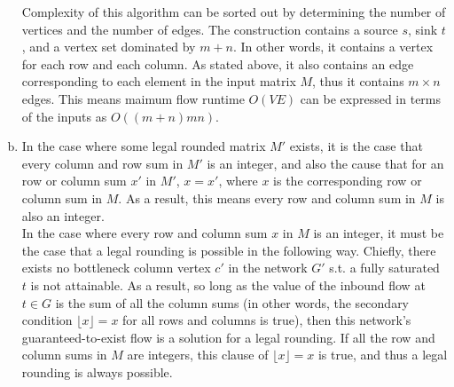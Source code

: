 \documentclass[11pt]{article}
\begin{document}
\begin{enumerate}[(a)]
\begin{solution}
    Complexity of this algorithm can be sorted out by determining the number of vertices and the number of edges. The construction contains a source $s$, sink $t$, and a vertex set dominated by $m + n$. In other words, it contains a vertex for each row and each column. As stated above, it also contains an edge corresponding to each element in the input matrix $M$, thus it contains $m \times n$ edges. This means maimum flow runtime $O(VE)$ can be expressed in terms of the inputs as $O((m + n)mn)$.
    \end{solution}
    \item
    \begin{solution}
        In the case where some legal rounded matrix $M'$ exists, it is the case that every column and row sum in $M'$ is an integer, and also the cause that for an row or column sum $x'$ in $M'$, $x = x'$, where $x$ is the corresponding row or column sum in $M$. As a result, this means every row and column sum in $M$ is also an integer. \\
        In the case where every row and column sum $x$ in $M$ is an integer, it must be the case that a legal rounding is possible in the following way. Chiefly, there exists no bottleneck column vertex $c'$ in the network $G'$ s.t. a fully saturated $t$ is not attainable. As a result, so long as the value of the inbound flow at $t \in G$ is the sum of all the column sums (in other words, the secondary condition $\lfloor x \rfloor = x$ for all rows and columns is true), then this network's guaranteed-to-exist flow is a solution for a legal rounding. If all the row and column sums in $M$ are integers, this clause of $\lfloor x \rfloor = x$ is true, and thus a legal rounding is always possible.
    \end{solution}
\end{enumerate}

\clearpage
\end{document}
